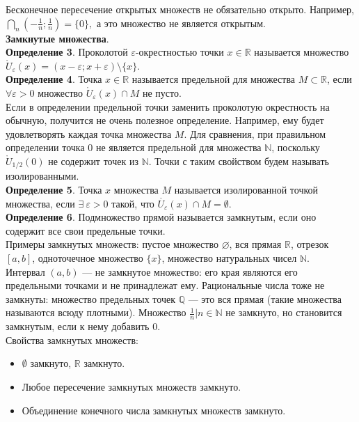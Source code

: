 \documentclass{report}
\begin{document}
Бесконечное пересечение открытых множеств не обязательно открыто. Например, $\bigcap_n \left(-\frac{1}{n};\frac{1}{n} \right) = \{0\},$ а это множество не является открытым.\\

\textbf{Замкнутые множества}.\\ 

\textbf{Определение 3}. Проколотой $\varepsilon$-окрестностью точки $x \in \mathbb{R}$ называется множество $\mathring{U}_{\varepsilon}(x)=(x-\varepsilon; x+\varepsilon)\setminus\{x\}$.\\ 

\textbf{Определение 4}. Точка $x \in \mathbb{R}$ называется предельной для множества $M \subset \mathbb{R}$, если $\forall \varepsilon > 0$ множество $\mathring{U}_{\varepsilon}(x) \cap M$ не пусто.\\ 

Если в определении предельной точки заменить проколотую окрестность на обычную, получится не очень полезное определение. Например, ему будет удовлетворять каждая точка множества $M$. Для сравнения, при правильном определении точка $0$ не является предельной для множества $\mathbb{N}$, поскольку $\mathring{U}_{1/2}(0)$ не содержит точек из $\mathbb{N}$. Точки с таким свойством будем называть изолированными. \\

\textbf{Определение 5}. Точка $x$ множества $M$ называется изолированной точкой множества, если $\exists~\varepsilon >0$ такой, что $\mathring{U_{\varepsilon}}(x) \cap M = \emptyset$.\\

\textbf{Определение 6}. Подмножество прямой называется замкнутым, если оно содержит все свои предельные точки.\\

Примеры замкнутых множеств: пустое множество $\varnothing$, вся прямая $\mathbb{R}$, отрезок $[a,b]$, одноточечное множество $\{x\}$, множество натуральных чисел $\mathbb{N}$. \\

Интервал $(a,b)$ — не замкнутое множество: его края являются его предельными точками и не принадлежат ему. Рациональные числа тоже не замкнуты: множество предельных точек $\mathbb{Q}$ — это вся прямая (такие множества называются всюду плотными). Множество {$\frac{1}{n} | n \in \mathbb{N}$} не замкнуто, но становится замкнутым, если к нему добавить $0$. \\

Свойства замкнутых множеств: 
\begin{itemize}
\item $\emptyset$ замкнуто, $\mathbb{R}$ замкнуто. 
\item Любое пересечение замкнутых множеств замкнуто. 
\item Объединение конечного числа замкнутых множеств замкнуто.
\end{itemize}
\end{document}
